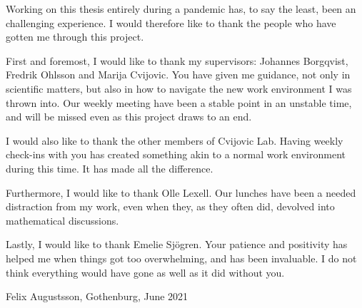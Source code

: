 
Working on this thesis entirely during a pandemic has, to say the least, been an challenging experience.
I would therefore like to thank the people who have gotten me through this project.

First and foremost, I would like to thank my supervisors: Johannes Borgqvist,
Fredrik Ohlsson and Marija Cvijovic.
You have given me guidance, not only in scientific matters, but also in how to navigate the new work environment I was thrown into.
Our weekly meeting have been a stable point in an unstable time, and will be missed even as this project draws to an end.

I would also like to thank the other members of Cvijovic Lab.
Having weekly check-ins with you has created something akin to a normal work environment during this time.
It has made all the difference.

Furthermore, I would like to thank Olle Lexell.
Our lunches have been a needed distraction from my work, even when they, as they often did, devolved into mathematical discussions.

Lastly, I would like to thank Emelie Sjögren.
Your patience and positivity has helped me when things got too overwhelming, and has been invaluable.
I do not think everything would have gone as well as it did without you.

\vspace{1.5cm}
\hfill
Felix Augustsson, Gothenburg, June 2021
